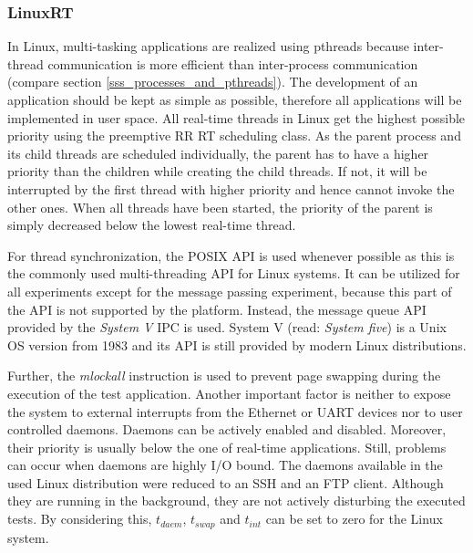 \subsubsection{LinuxRT}\label{ss_linuxRT_application_design}
In Linux, multi-tasking applications are realized using pthreads because inter-thread communication is more efficient than inter-process communication (compare section \ref{sss_processes_and_pthreads}).
The development of an application should be kept as simple as possible, therefore all applications will be implemented in user space.
All real-time threads in Linux get the highest possible priority using the preemptive \ac{RR} \ac{RT} scheduling class.
As the parent process and its child threads are scheduled individually, the parent has to have a higher priority than the children while creating the child threads.
If not, it will be interrupted by the first thread with higher priority and hence cannot invoke the other ones.
When all threads have been started, the priority of the parent is simply decreased below the lowest real-time thread.
\par
For thread synchronization, the \ac{POSIX} \ac{API} is used whenever possible as this is the commonly used multi-threading \ac{API} for Linux systems.
It can be utilized for all experiments except for the message passing experiment, because this part of the \ac{API} is not supported by the platform.
Instead, the message queue \ac{API} provided by the \textit{System V} \ac{IPC} is used.
System V (read: \textit{System five}) \cite{tlip:svd} is a Unix \ac{OS} version from 1983 and its \ac{API} is still provided by modern Linux distributions.
\par
Further, the \textit{mlockall} instruction is used to prevent page swapping during the execution of the test application.
Another important factor is neither to expose the system to external interrupts from the Ethernet or \ac{UART} devices nor to user controlled daemons.
Daemons can be actively enabled and disabled.
Moreover, their priority is usually below the one of real-time applications.
Still, problems can occur when daemons are highly \ac{I/O} bound.
The daemons available in the used Linux distribution were reduced to an \ac{SSH} and an \ac{FTP} client.
Although they are running in the background, they are not actively disturbing the executed tests.
By considering this, $t_{daem}$, $ t_{swap} $ and $ t_{int} $ can be set to zero for the Linux system.
 
